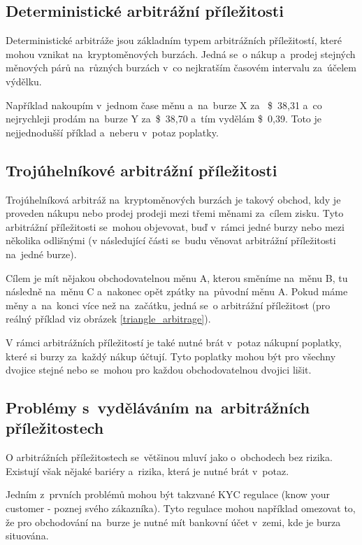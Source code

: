 \documentclass[thesis=B,czech]{FITthesis}[2019/03/21]
\begin{document}
\subsection{Deterministické arbitrážní příležitosti}
Deterministické arbitráže jsou základním typem arbitrážních příležitostí, které mohou vznikat na~kryptoměnových burzách. Jedná se~o nákup a~prodej \linebreak stejných měnových párů na~různých burzách v~co nejkratším časovém intervalu za~účelem výdělku. \cite{CZInvestor} \cite{TowardsDataScience}

Například nakoupím v~jednom čase měnu a~na~burze X za~ \$~38,31 a~co nejrychleji prodám na~burze Y za~\$~38,70 a~tím vydělám  \$~0,39. Toto je nejjednodušší příklad a~neberu v~potaz poplatky. 

\subsection{Trojúhelníkové arbitrážní příležitosti}
Trojúhelníková arbitráž na~kryptoměnových burzách je takový obchod, kdy je proveden nákupu nebo prodej prodeji mezi třemi měnami za~cílem zisku. Tyto arbitrážní příležitosti se~mohou objevovat, buď v~rámci jedné burzy nebo mezi několika odlišnými (v následující části se~budu věnovat arbitrážní příležitosti na~jedné burze). \cite{TradingStrategy}

Cílem je mít nějakou obchodovatelnou měnu A, kterou směníme na~měnu B, tu následně na~měnu C a~nakonec opět zpátky na~původní měnu A. Pokud máme měny a~na~konci více než na~začátku, jedná se~o arbitrážní příležitost (pro reálný příklad viz obrázek \ref{triangle_arbitrage}).

V rámci arbitrážních příležitostí je také nutné brát v~potaz nákupní poplatky, které si burzy za~každý nákup účtují. Tyto poplatky mohou být pro všechny dvojice stejné nebo se~mohou pro každou obchodovatelnou dvojici lišit.  

\subsection{Problémy s~vyděláváním na~arbitrážních příležitostech}
O arbitrážních příležitostech se~většinou mluví jako o~obchodech bez rizika. Existují však nějaké bariéry a~rizika, která je nutné brát v~potaz.

Jedním z~prvních problémů mohou být takzvané KYC regulace (know your customer - poznej svého zákazníka). Tyto regulace mohou například omezovat to, že pro obchodování na~burze je nutné mít bankovní účet v~zemi, kde je burza situována.
\end{document}
